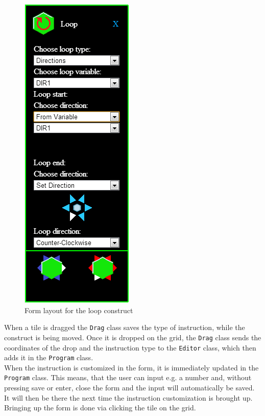 \begin{figure}[ht]
\begin{center}
\includegraphics[scale=0.5]{img/editor_loop_form.png}
\caption{Form layout for the loop construct}
\label{fig:form_layout}
\end{center}
\end{figure}

When a tile is dragged the \texttt{Drag} class saves the type of instruction, while the construct is being moved.
Once it is dropped on the grid, the \texttt{Drag} class sends the coordinates of the drop and the instruction type to the \texttt{Editor} class, which then adds it in the \texttt{Program} class.\\

When the instruction is customized in the form, it is immediately updated in the \texttt{Program} class.
This means, that the user can input e.g. a number and, without pressing save or enter, close the form and the input will automatically be saved.
It will then be there the next time the instruction customization is brought up.
Bringing up the form is done via clicking the tile on the grid.

